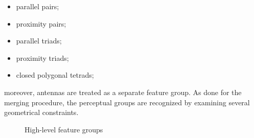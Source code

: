 \begin{itemize}
  \item parallel pairs;
  \item proximity pairs;
  \item parallel triads;
  \item proximity triads;
  \item closed polygonal tetrads;
\end{itemize}

moreover, antennas are treated as a separate feature group.
As done for the merging procedure, the perceptual groups are recognized by examining several geometrical constraints.

\begin{figure}[htbp]
  \centering
  \qquad
  \qquad
  \qquad
  \qquad
  \qquad
  \caption{High-level feature groups \cite{Sharma2018}}
  \label{fig:highLevelGroups}
\end{figure}

